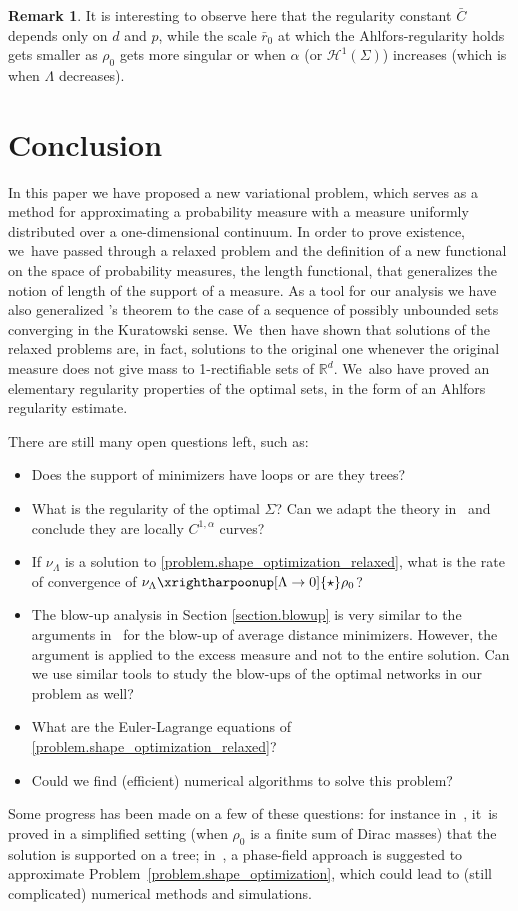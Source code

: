 \documentclass[JEP,XML,SOM,Unicode,NoFloatCountersInSection,published]{cedram}
\theoremstyle{definition}
\newtheorem{remark}[theorem]{Remark}
\newcommand\cH{\mathcal{H}}
\newcommand{\RR}{\mathbb{R}}
\begin{document}
\begin{remark} It is interesting to observe here that the regularity constant
$\bar C$ depends only on $d$ and $p$, while the scale $\bar r_0$ at which the Ahlfors-regularity
holds gets smaller as $\rho_0$ gets more singular or when $\alpha$ (or $\cH^1(\Sigma)$) increases (which is when $\Lambda$ decreases).
\end{remark}

\section{Conclusion}\label{section.conclusion}
In this paper we have proposed a new variational problem, which serves as a method for approximating a probability measure with a measure uniformly distributed over a one-dimensional continuum.
In order to prove existence, we~have passed through a relaxed problem and the definition of a new functional on the space of probability measures, the length functional, that generalizes the notion of length of the support of a measure. As a tool for our analysis we have also generalized \Golab's theorem to the case of a sequence of possibly unbounded sets converging in the Kuratowski sense. We~then have shown that solutions of the relaxed
problems are, in fact, solutions to the original one whenever the original measure does not give mass to 1-rectifiable sets of $\RR^d$. We~also have proved an elementary regularity properties of the
optimal sets, in the form of an Ahlfors regularity estimate.

There are still many open questions left, such as:
\begin{itemize}
\item Does the support of minimizers have loops or are they trees?
\item What is the regularity of the optimal $\Sigma$? Can we adapt the theory in~\cite{morgan1994m} and conclude they are locally $C^{1,\alpha}$ curves?
\item If $\nu_\Lambda$ is a solution to \eqref{problem.shape_optimization_relaxed}, what is the rate of convergence of $\nu_\Lambda \xrightharpoonup[\Lambda \to 0]{\star} \rho_0$?
\item The blow-up analysis in Section \ref{section.blowup} is very similar to the arguments in~\cite{santambrogio2005blow} for the blow-up of average distance minimizers. However, the argument is applied to the excess measure and not to the entire solution. Can we use similar tools to study the blow-ups of the optimal networks in our problem as well?
\item What are the Euler-Lagrange equations of \eqref{problem.shape_optimization_relaxed}?
\item Could we find (efficient) numerical algorithms to solve this problem?
\end{itemize}
Some progress has been made on a few of these questions: for instance in~\cite{MachadoThesis},
it~is proved in a simplified setting (when $\rho_0$ is a finite sum
of Dirac masses) that the solution is supported on a tree; in~\cite{MachadoPhaseField},
a phase-field approach is suggested to approximate Problem~\eqref{problem.shape_optimization}, which could
lead to (still complicated) numerical methods and simulations.
\end{document}
